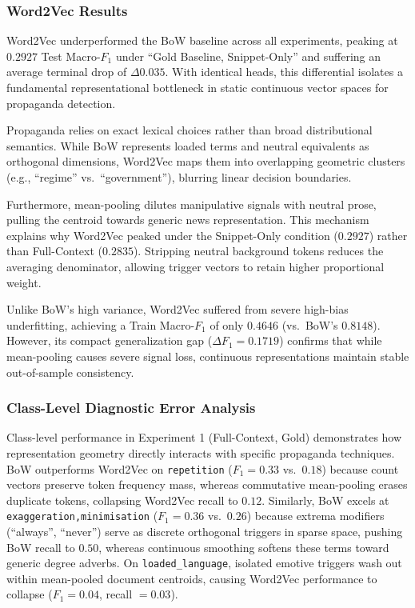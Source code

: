 \documentclass[12pt, a4paper]{article}
\begin{document}
\subsubsection{Word2Vec Results}
\label{subsubsec:w2v_results}

Word2Vec underperformed the BoW baseline across all experiments, peaking at $0.2927$ Test Macro-$F_1$ under ``Gold Baseline, Snippet-Only'' and suffering an average terminal drop of $\Delta 0.035$. With identical heads, this differential isolates a fundamental representational bottleneck in static continuous vector spaces for propaganda detection.

Propaganda relies on exact lexical choices rather than broad distributional semantics. While BoW represents loaded terms and neutral equivalents as orthogonal dimensions, Word2Vec maps them into overlapping geometric clusters (e.g., ``regime'' vs.\ ``government''), blurring linear decision boundaries.

Furthermore, mean-pooling dilutes manipulative signals with neutral prose, pulling the centroid towards generic news representation. This mechanism explains why Word2Vec peaked under the Snippet-Only condition ($0.2927$) rather than Full-Context ($0.2835$). Stripping neutral background tokens reduces the averaging denominator, allowing trigger vectors to retain higher proportional weight.

Unlike BoW's high variance, Word2Vec suffered from severe high-bias underfitting, achieving a Train Macro-$F_1$ of only $0.4646$ (vs.\ BoW's $0.8148$). However, its compact generalization gap ($\Delta F_1 = 0.1719$) confirms that while mean-pooling causes severe signal loss, continuous representations maintain stable out-of-sample consistency.

\subsubsection{Class-Level Diagnostic Error Analysis}
\label{subsubsec:class_level_error_analysis}

Class-level performance in Experiment 1 (Full-Context, Gold) demonstrates how representation geometry directly interacts with specific propaganda techniques. BoW outperforms Word2Vec on \texttt{repetition} ($F_1 = 0.33$ vs.\ $0.18$) because count vectors preserve token frequency mass, whereas commutative mean-pooling erases duplicate tokens, collapsing Word2Vec recall to $0.12$. Similarly, BoW excels at \texttt{exaggeration,minimisation} ($F_1 = 0.36$ vs.\ $0.26$) because extrema modifiers (``always'', ``never'') serve as discrete orthogonal triggers in sparse space, pushing BoW recall to $0.50$, whereas continuous smoothing softens these terms toward generic degree adverbs. On \texttt{loaded\_language}, isolated emotive triggers wash out within mean-pooled document centroids, causing Word2Vec performance to collapse ($F_1 = 0.04$, recall $= 0.03$).
\end{document}

